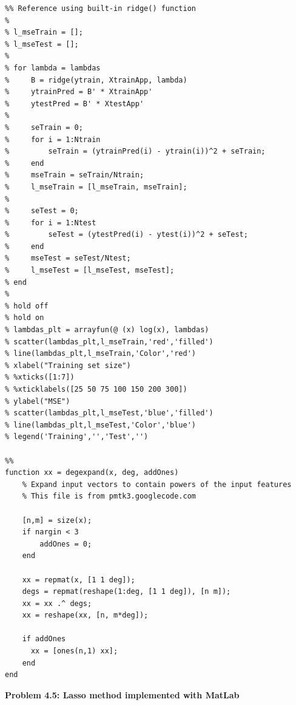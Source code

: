 \documentclass[11pt]{article}
\begin{document}
\begin{verbatim}
%% Reference using built-in ridge() function
% 
% l_mseTrain = [];
% l_mseTest = [];
% 
% for lambda = lambdas
%     B = ridge(ytrain, XtrainApp, lambda)
%     ytrainPred = B' * XtrainApp'
%     ytestPred = B' * XtestApp'
% 
%     seTrain = 0;
%     for i = 1:Ntrain
%         seTrain = (ytrainPred(i) - ytrain(i))^2 + seTrain;
%     end
%     mseTrain = seTrain/Ntrain;
%     l_mseTrain = [l_mseTrain, mseTrain];
%     
%     seTest = 0;
%     for i = 1:Ntest
%         seTest = (ytestPred(i) - ytest(i))^2 + seTest;
%     end
%     mseTest = seTest/Ntest;
%     l_mseTest = [l_mseTest, mseTest];
% end
% 
% hold off
% hold on
% lambdas_plt = arrayfun(@ (x) log(x), lambdas)
% scatter(lambdas_plt,l_mseTrain,'red','filled')
% line(lambdas_plt,l_mseTrain,'Color','red')
% xlabel("Training set size")
% %xticks([1:7])
% %xticklabels([25 50 75 100 150 200 300])
% ylabel("MSE")
% scatter(lambdas_plt,l_mseTest,'blue','filled')
% line(lambdas_plt,l_mseTest,'Color','blue')
% legend('Training','','Test','')

%% 
function xx = degexpand(x, deg, addOnes)
    % Expand input vectors to contain powers of the input features
    % This file is from pmtk3.googlecode.com
    
    [n,m] = size(x);
    if nargin < 3
        addOnes = 0; 
    end
    
    xx = repmat(x, [1 1 deg]);
    degs = repmat(reshape(1:deg, [1 1 deg]), [n m]);
    xx = xx .^ degs;
    xx = reshape(xx, [n, m*deg]);
    
    if addOnes
      xx = [ones(n,1) xx];
    end
end
\end{verbatim}

\textbf{Problem 4.5: Lasso method implemented with MatLab}\\
\end{document}
